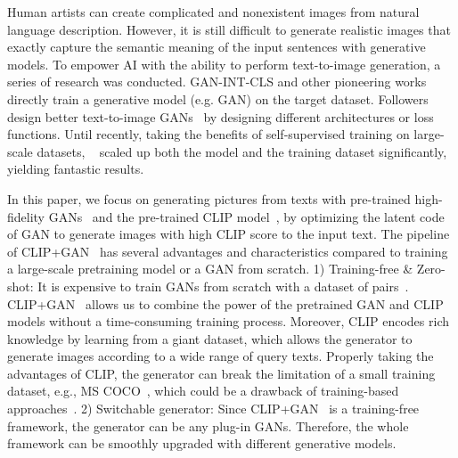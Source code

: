 \documentclass[10pt,twocolumn,letterpaper]{article}
\newcommand{\ganclip}{CLIP+GAN}
\begin{document}
\iffalse 
\red{==========}
Human artists can create complicated and nonexistent images from natural language description. 
However, it is still difficult to generate realistic images that exactly capture the semantic meaning of the input sentences with generative models.
To empower AI with the ability to perform text-to-image generation,
a series of research was conducted. 
GAN-INT-CLS \cite{reed2016generative} and other pioneering works directly train a generative model (e.g. GAN) on the target dataset. Followers design better text-to-image GANs~\cite{xu2018attngan, li2019object, tao2020df} by designing different architectures or loss functions.
Until recently, 
taking the benefits of self-supervised training on large-scale datasets,  
~\cite{ramesh2021zero, ding2021cogview} scaled up both the model and the training dataset significantly, yielding fantastic results. 

In this paper, we focus on generating pictures from texts with pre-trained high-fidelity GANs~\cite{brock2018large, karras2019style} and the pre-trained CLIP model~\cite{radford2021learning}, by optimizing the latent code of GAN to generate images with high CLIP score to the input text.
The pipeline of \ganclip~ has several advantages and characteristics compared to training a large-scale pretraining model or a GAN from scratch.
1) Training-free \& Zero-shot: 
It is expensive to train GANs from scratch with a dataset of  pairs~\cite{mansimov2015generating, reed2016generative, xu2018attngan, li2019object, tao2020df, ramesh2021zero}. 
\ganclip~ allows us to combine the power of the pretrained GAN and CLIP models without a time-consuming training process.
Moreover, CLIP encodes rich knowledge by learning from a giant dataset, which allows the generator to generate images according to a wide range of query texts.
Properly taking the advantages of CLIP, 
the generator can break the limitation of a small training dataset, e.g., MS COCO~\cite{lin2014microsoft}, which could be a drawback of training-based approaches~\cite{mansimov2015generating, xu2018attngan, li2019object}. 
2) Switchable generator: Since \ganclip~ is a training-free framework, the generator can be any plug-in GANs. Therefore, the whole framework can be smoothly upgraded with different generative models. 
\end{document}
